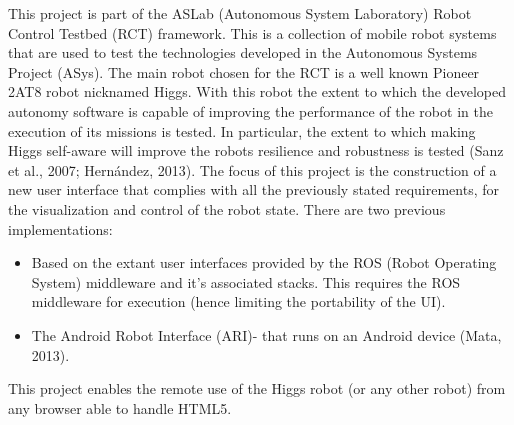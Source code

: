 This project is part of the ASLab (Autonomous System Laboratory) Robot Control Testbed (RCT) framework. This is a collection 
of mobile robot systems that are used to test the technologies developed in the Autonomous Systems Project (ASys). The main 
robot chosen for the RCT is a well known Pioneer 2AT8 robot nicknamed Higgs. With this robot the extent to which the 
developed autonomy software is capable of improving the performance of the robot in the execution of its missions is tested. 
In particular, the extent to which making Higgs self-aware will improve the robots resilience and robustness is tested (Sanz 
et al., 2007; Hernández, 2013). The focus of this project is the construction of a new user interface that complies with all 
the previously stated requirements, for the visualization and control of the robot state. There are two previous 
implementations:
\begin{itemize}
	\item Based on the extant user interfaces provided by the ROS (Robot Operating System) middleware and it's associated 
	stacks. This requires the ROS middleware for execution (hence limiting the portability of the UI).
	\item The Android Robot Interface (ARI)- that runs on an Android device (Mata, 2013).
\end{itemize}
This project enables the remote use of the Higgs robot (or any other robot) from any browser able to handle HTML5.